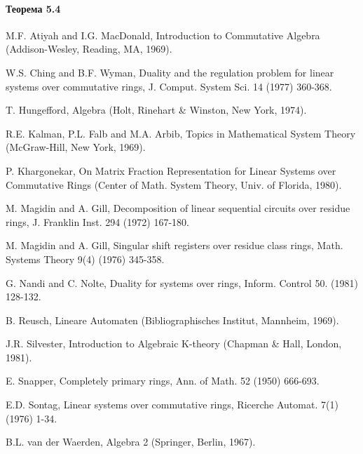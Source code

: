 \documentclass[a4paper,12pt]{article}
\begin{document}
\paragraph{Теорема 5.4}

\pagebreak
\begin{thebibliography}{99}
	
	M.F. Atiyah and I.G. MacDonald,
	Introduction to Commutative Algebra
	(Addison-Wesley, Reading, MA, 1969).
	
	W.S. Ching and B.F. Wyman,
	Duality and the regulation problem for linear systems over commutative rings,
	J. Comput. System Sci. 14 (1977) 360-368.

	T. Hungefford,
	Algebra
	(Holt, Rinehart \& Winston, New York, 1974).
	
	R.E. Kalman, P.L. Falb and M.A. Arbib,
	Topics in Mathematical System Theory
	(McGraw-Hill, New York, 1969).
	
	P. Khargonekar, On Matrix Fraction Representation for Linear Systems over Commutative Rings
	(Center of Math. System Theory, Univ. of Florida, 1980).
	
	M. Magidin and A. Gill,
	Decomposition of linear sequential circuits over residue rings,
	J. Franklin Inst. 294 (1972) 167-180.
	
	M. Magidin and A. Gill,
	Singular shift registers over residue class rings,
	Math. Systems Theory 9(4) (1976) 345-358.
	
	G. Nandi and C. Nolte,
	Duality for systems over rings,
	Inform. Control 50. (1981) 128-132.
	
	B. Reusch,
	Lineare Automaten
	(Bibliographisches Institut, Mannheim, 1969).
	
	J.R. Silvester,
	Introduction to Algebraic K-theory
	(Chapman \& Hall, London, 1981).
	
	E. Snapper,
	Completely primary rings,
	Ann. of Math. 52 (1950) 666-693.
	
	E.D. Sontag,
	Linear systems over commutative rings, Ricerche Automat.
	7(1) (1976) 1-34.
	
	B.L. van der Waerden,
	Algebra 2
	(Springer, Berlin, 1967).
	
\end{thebibliography}
\end{document}
